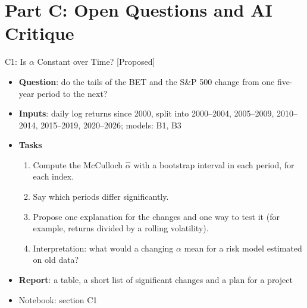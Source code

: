 \section{Part C: Open Questions and AI Critique}

\begin{frame}{C1: Is $\alpha$ Constant over Time? [Proposed]}
\itemsize{\footnotesize}
\begin{itemize}
\item \textbf{Question}: do the tails of the BET and the S\&P 500 change from one five-year period to the next?
\item \textbf{Inputs}: daily log returns since 2000, split into 2000--2004, 2005--2009, 2010--2014, 2015--2019, 2020--2026; models: B1, B3
\item \textbf{Tasks}
\begin{enumerate}
    \item Compute the McCulloch $\hat\alpha$ with a bootstrap interval in each period, for each index.
    \item Say which periods differ significantly.
    \item Propose one explanation for the changes and one way to test it (for example, returns divided by a rolling volatility).
    \item Interpretation: what would a changing $\alpha$ mean for a risk model estimated on old data?
\end{enumerate}
\item \textbf{Report}: a table, a short list of significant changes and a plan for a project
\item Notebook: section C1
\end{itemize}
\end{frame}

